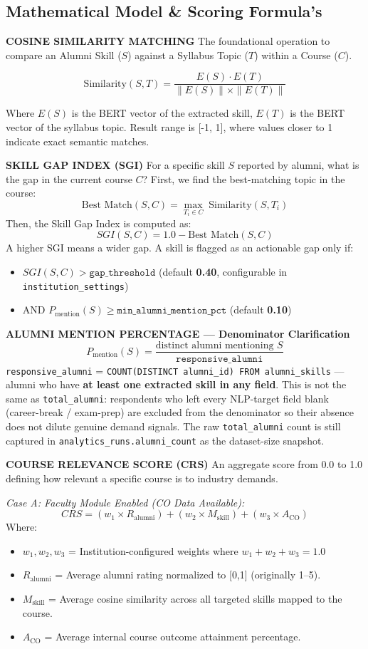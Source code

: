\subsection{Mathematical Model \& Scoring Formula's}
\textbf{COSINE SIMILARITY MATCHING}
The foundational operation to compare an Alumni Skill ($S$) against a Syllabus Topic ($T$) within a Course ($C$).

\[
\text{Similarity}(S, T) = \frac{E(S) \cdot E(T)}{\|E(S)\| \times \|E(T)\|}
\]

Where $E(S)$ is the BERT vector of the extracted skill, $E(T)$ is the BERT vector of the syllabus topic. Result range is [-1, 1], where values closer to 1 indicate exact semantic matches.

\textbf{SKILL GAP INDEX (SGI)}
For a specific skill $S$ reported by alumni, what is the gap in the current course $C$?
First, we find the best-matching topic in the course:
\[
\text{Best Match}(S, C) = \max_{T_i \in C} \; \text{Similarity}(S, T_i)
\]
Then, the Skill Gap Index is computed as:
\[
SGI(S, C) = 1.0 - \text{Best Match}(S, C)
\]
A higher SGI means a wider gap. A skill is flagged as an actionable gap only if:
\begin{itemize}
    \item $SGI(S, C) > \texttt{gap\_threshold}$ (default \textbf{0.40}, configurable in \texttt{institution\_settings})
    \item AND $P_{\text{mention}}(S) \geq \texttt{min\_alumni\_mention\_pct}$ (default \textbf{0.10})
\end{itemize}

\textbf{ALUMNI MENTION PERCENTAGE --- Denominator Clarification}
\[
P_{\text{mention}}(S) = \frac{\text{distinct alumni mentioning } S}{\texttt{responsive\_alumni}}
\]
\texttt{responsive\_alumni} = \texttt{COUNT(DISTINCT alumni\_id) FROM alumni\_skills} --- alumni who have \textbf{at least one extracted skill in any field}. This is not the same as \texttt{total\_alumni}: respondents who left every NLP-target field blank (career-break / exam-prep) are excluded from the denominator so their absence does not dilute genuine demand signals. The raw \texttt{total\_alumni} count is still captured in \texttt{analytics\_runs.alumni\_count} as the dataset-size snapshot.

\textbf{COURSE RELEVANCE SCORE (CRS)}
An aggregate score from 0.0 to 1.0 defining how relevant a specific course is to industry demands.

\textit{Case A: Faculty Module Enabled (CO Data Available):}
\[
CRS = (w_1 \times R_{\text{alumni}}) + (w_2 \times M_{\text{skill}}) + (w_3 \times A_{\text{CO}})
\]
Where:
\begin{itemize}
    \item $w_1, w_2, w_3$ = Institution-configured weights where $w_1 + w_2 + w_3 = 1.0$
    \item $R_{\text{alumni}}$ = Average alumni rating normalized to [0,1] (originally 1--5).
    \item $M_{\text{skill}}$ = Average cosine similarity across all targeted skills mapped to the course.
    \item $A_{\text{CO}}$ = Average internal course outcome attainment percentage.
\end{itemize}

